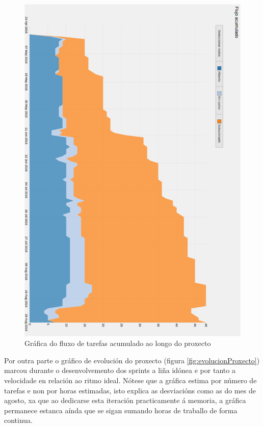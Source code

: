 \begin{figure}[htp]
\begin{center}
    \includegraphics[scale=0.6]{figures/YouTrack/fluxoAcumulado.png}
    \caption{Gráfica do fluxo de tarefas acumulado ao longo do proxecto}
\label{fig:fluxoAcumulado}
\end{center}
\end{figure}

Por outra parte o gráfico de evolución do proxecto (figura \ref{fig:evolucionProxecto}) marcou 
durante o desenvolvemento dos sprints a liña idónea e por tanto a velocidade en relación ao ritmo
ideal. Nótese que a gráfica estima por número de tarefas e non por horas estimadas, isto 
explica as desviacións como as do mes de agosto, xa que ao dedicarse esta iteración practicamente á
memoria, a gráfica permanece estanca aínda que se sigan sumando horas de traballo de forma continua.

